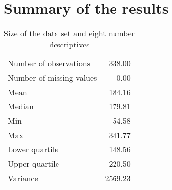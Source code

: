 \documentclass[a4paper,11pt]{article}\usepackage[]{graphicx}\usepackage[]{color}
\begin{document}
\newpage
\section{Summary of the results}

\begin{table}[ht]
\begin{flushleft}
\caption{Size of the data set and eight number descriptives} 
\label{modelSummary}
\begin{tabular}{lr}
  \hline
  \hline
Number of observations & 338.00 \\ 
  Number of missing values & 0.00 \\ 
  Mean & 184.16 \\ 
  Median & 179.81 \\ 
  Min & 54.58 \\ 
  Max & 341.77 \\ 
  Lower quartile & 148.56 \\ 
  Upper quartile & 220.50 \\ 
  Variance & 2569.23 \\ 
   \hline
\end{tabular}
\end{flushleft}
\end{table}
\end{document}
